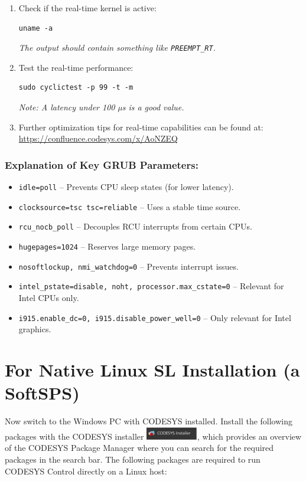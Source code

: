 \documentclass[a4paper,12pt]{article}
\begin{document}
\begin{enumerate}
\item Check if the real-time kernel is active:
\begin{lstlisting}
uname -a
\end{lstlisting}
\textit{The output should contain something like \texttt{PREEMPT\_RT}.}

\item Test the real-time performance:
\begin{lstlisting}
sudo cyclictest -p 99 -t -m
\end{lstlisting}
\textit{Note: A latency under 100 µs is a good value.}

\item Further optimization tips for real-time capabilities can be found at: \\ 
\url{https://confluence.codesys.com/x/AoNZEQ}
\end{enumerate}

\subsubsection*{Explanation of Key GRUB Parameters:}
\begin{itemize}
\item \texttt{idle=poll} – Prevents CPU sleep states (for lower latency).
\item \texttt{clocksource=tsc tsc=reliable} – Uses a stable time source.
\item \texttt{rcu\_nocb\_poll} – Decouples RCU interrupts from certain CPUs.
\item \texttt{hugepages=1024} – Reserves large memory pages.
\item \texttt{nosoftlockup, nmi\_watchdog=0} – Prevents interrupt issues.
\item \texttt{intel\_pstate=disable, noht, processor.max\_cstate=0} – Relevant for Intel CPUs only.
\item \texttt{i915.enable\_dc=0, i915.disable\_power\_well=0} – Only relevant for Intel graphics.
\end{itemize}
\newpage


\section{For Native Linux SL Installation (a SoftSPS)}

Now switch to the Windows PC with CODESYS installed. Install the following packages with the CODESYS installer \includegraphics[width=0.17\textwidth]{29.jpg}, which provides an overview of the CODESYS Package Manager where you can search for the required packages in the search bar. The following packages are required to run CODESYS Control directly on a Linux host:
\end{document}

